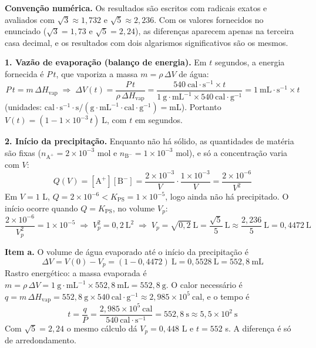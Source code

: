 \documentclass{article}%
\begin{document}
\textbf{Convenção numérica.} Os resultados são escritos com radicais exatos e avaliados com $\sqrt{3} \approx 1{,}732$ e $\sqrt{5} \approx 2{,}236$. Com os valores fornecidos no enunciado ($\sqrt{3} = 1{,}73$ e $\sqrt{5} = 2{,}24$), as diferenças aparecem apenas na terceira casa decimal, e os resultados com dois algarismos significativos são os mesmos.

\textbf{1. Vazão de evaporação (balanço de energia).} Em $t$ segundos, a energia fornecida é $P\,t$, que vaporiza a massa $m = \rho\,\Delta V$ de água:
\[
P\,t = m\,\Delta H_{\text{vap}} \;\Rightarrow\; \Delta V(t) = \frac{P\,t}{\rho\,\Delta H_{\text{vap}}} = \frac{540\ \text{cal}\cdot\text{s}^{-1}\times t}{1\ \text{g}\cdot\text{mL}^{-1}\times 540\ \text{cal}\cdot\text{g}^{-1}} = 1\ \text{mL}\cdot\text{s}^{-1}\times t
\]
(unidades: $\text{cal}\cdot\text{s}^{-1}\cdot\text{s}/(\text{g}\cdot\text{mL}^{-1}\cdot\text{cal}\cdot\text{g}^{-1}) = \text{mL}$). Portanto $V(t) = \left(1 - 1\times10^{-3}\,t\right)\ \text{L}$, com $t$ em segundos.

\textbf{2. Início da precipitação.} Enquanto não há sólido, as quantidades de matéria são fixas ($n_{\text{A}^+} = 2\times10^{-3}$ mol e $n_{\text{B}^-} = 1\times10^{-3}$ mol), e só a concentração varia com $V$:
\[
Q(V) = [\text{A}^+][\text{B}^-] = \frac{2\times10^{-3}}{V}\cdot\frac{1\times10^{-3}}{V} = \frac{2\times10^{-6}}{V^2}
\]
Em $V = 1$ L, $Q = 2\times10^{-6} < K_{\text{PS}} = 1\times10^{-5}$, logo ainda não há precipitado. O início ocorre quando $Q = K_{\text{PS}}$, no volume $V_p$:
\[
\frac{2\times10^{-6}}{V_p^2} = 1\times10^{-5} \;\Rightarrow\; V_p^2 = 0{,}2\ \text{L}^2 \;\Rightarrow\; V_p = \sqrt{0{,}2}\ \text{L} = \frac{\sqrt{5}}{5}\ \text{L} \approx \frac{2{,}236}{5}\ \text{L} = 0{,}4472\ \text{L}
\]

\textbf{Item a.} O volume de água evaporado até o início da precipitação é
\[
\Delta V = V(0) - V_p = (1 - 0{,}4472)\ \text{L} = 0{,}5528\ \text{L} = 552{,}8\ \text{mL}
\]
Rastro energético: a massa evaporada é $m = \rho\,\Delta V = 1\ \text{g}\cdot\text{mL}^{-1}\times 552{,}8\ \text{mL} = 552{,}8\ \text{g}$. O calor necessário é $q = m\,\Delta H_{\text{vap}} = 552{,}8\ \text{g}\times 540\ \text{cal}\cdot\text{g}^{-1} \approx 2{,}985\times10^{5}\ \text{cal}$, e o tempo é
\[
t = \frac{q}{P} = \frac{2{,}985\times10^{5}\ \text{cal}}{540\ \text{cal}\cdot\text{s}^{-1}} = 552{,}8\ \text{s} \approx 5{,}5\times10^{2}\ \text{s}
\]
Com $\sqrt{5} = 2{,}24$ o mesmo cálculo dá $V_p = 0{,}448$ L e $t = 552$ s. A diferença é só de arredondamento.
\end{document}
